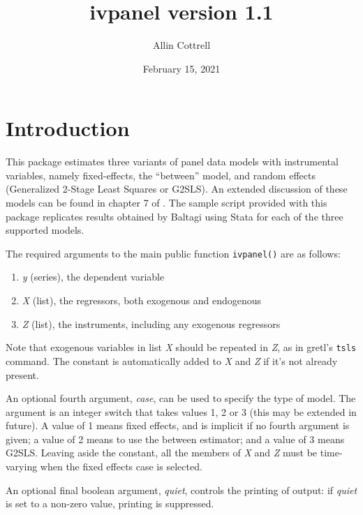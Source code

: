 \documentclass{article}
\begin{document}
\setlength{\parindent}{0pt}
\setlength{\parskip}{1ex}

\newcommand{\argname}[1]{\textsl{#1}}

\title{ivpanel version 1.1}
\author{Allin Cottrell}
\date{February 15, 2021}
\maketitle

\section{Introduction}

This package estimates three variants of panel data models with
instrumental variables, namely fixed-effects, the ``between'' model,
and random effects (Generalized 2-Stage Least Squares or G2SLS). An
extended discussion of these models can be found in chapter 7 of
\cite{baltagi05}. The sample script provided with this package
replicates results obtained by Baltagi using \textsf{Stata} for
each of the three supported models.

The required arguments to the main public function \texttt{ivpanel()}
are as follows:

\begin{enumerate}
\item \argname{y} (series), the dependent variable
\item \argname{X} (list), the regressors, both exogenous and endogenous
\item \argname{Z} (list), the instruments, including any exogenous
  regressors
\end{enumerate}

Note that exogenous variables in list \argname{X} should be repeated
in \argname{Z}, as in gretl's \texttt{tsls} command. The constant is
automatically added to \argname{X} and \argname{Z} if it's not already
present.

An optional fourth argument, \argname{case}, can be used to specify
the type of model. The argument is an integer switch that takes values
1, 2 or 3 (this may be extended in future).  A value of 1 means fixed
effects, and is implicit if no fourth argument is given; a value of 2
means to use the between estimator; and a value of 3 means G2SLS.
Leaving aside the constant, all the members of \argname{X} and
\argname{Z} must be time-varying when the fixed effects case is
selected.

An optional final boolean argument, \argname{quiet}, controls the
printing of output: if \argname{quiet} is set to a non-zero value,
printing is suppressed.
\end{document}
